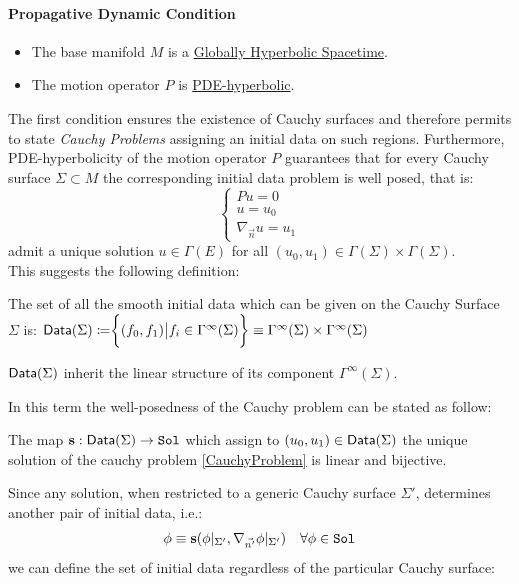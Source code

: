 \documentclass[Main]{subfiles}
\begin{document}
		\paragraph{Propagative Dynamic Condition}
		\begin{itemize}
			 \item The base manifold $M$ is a \underline{Globally Hyperbolic Spacetime}.
			 \item The motion operator $P$ is \underline{PDE-hyperbolic}.
		\end{itemize}
		The first condition ensures the existence of Cauchy surfaces and therefore permits to state  \emph{Cauchy Problems} assigning an initial data on such regions.
		Furthermore, PDE-hyperbolicity of the motion operator $P$ guarantees that for every Cauchy surface $\Sigma \subset M$ the corresponding initial data problem is well posed, that is:
			\begin{equation}\label{CauchyProblem}
				\begin{cases} P u = 0 \\ u = u_0 \\ \nabla_{\vec{n}}u= u_1 \end{cases}
			\end{equation}
			admit a unique solution $u\in \Gamma(E)$ for all $(u_0, u_1) \in \Gamma (\Sigma )\times \Gamma (\Sigma )$.
			\\
			This suggests the following definition:
			\begin{notationfix}
				The set of all the smooth initial data which can be given on the Cauchy Surface $\Sigma$ is:
				$\mathsf{Data}(\Sigma)  \coloneqq \biggr \{ (f_0,f_1) \big \vert f_i \in \Gamma^\infty(\Sigma)\biggr\}  \equiv  \Gamma^\infty(\Sigma) \times \Gamma^\infty(\Sigma)$
			\end{notationfix}
			\begin{observation}
				$\mathsf{Data}(\Sigma)$ inherit the linear structure of its component $ \Gamma^\infty(\Sigma)$.
			\end{observation}	
			In this term the well-posedness of the Cauchy problem can be stated as follow:

			\begin{proposition}
				The map $ 	 \mathbf{s} : \mathsf{Data} (\Sigma ) \rightarrow \mathtt{Sol} $ which assign to $(u_0, u_1)\in \mathsf{Data}(\Sigma)$ the unique solution of the cauchy problem \ref{CauchyProblem} is linear and bijective.
			\end{proposition}
			
			Since any solution, when restricted to a generic Cauchy surface $\Sigma'$, determines another pair of initial data, i.e.:
			\begin{displaymath}
				\phi \equiv \mathbf{s} (\phi \vert_{\Sigma'}, \nabla_{\vec{n'}}\phi	 \vert_{\Sigma'} )	\quad \forall \phi\in \mathtt{Sol}
			\end{displaymath}						
			we can define the set of initial data regardless of the particular Cauchy surface:			
			
\end{document}

